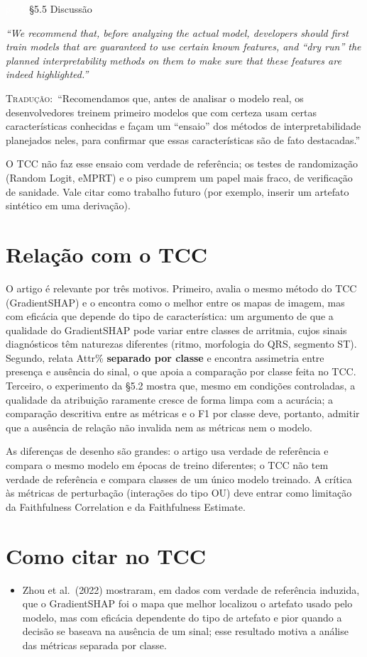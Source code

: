 \documentclass[11pt,a4paper]{article}
\newcommand{\pagechip}[1]{{\setlength{\fboxsep}{1.5pt}\colorbox{cAcc}{\textcolor{white}{\scriptsize\texttt{#1}}}}}
\newenvironment{origquote}{\par\itshape\small}{\par}
\newenvironment{tradquote}{\par\small\textsc{Tradução:}\ }{\par}
\newcommand{\explab}[1]{\par\smallskip{\small\color{cAcc}\textbf{\MakeUppercase{#1}}}\par}
\begin{document}
\begin{citacard}{\pagechip{p. 6} §5.5 Discussão}
\begin{origquote}“We recommend that, before analyzing the actual model, developers should first train models that are guaranteed to use certain known features, and “dry run” the planned interpretability methods on them to make sure that these features are indeed highlighted.”\end{origquote}
\begin{tradquote}“Recomendamos que, antes de analisar o modelo real, os desenvolvedores treinem primeiro modelos que com certeza usam certas características conhecidas e façam um “ensaio” dos métodos de interpretabilidade planejados neles, para confirmar que essas características são de fato destacadas.”\end{tradquote}
\explab{Explicação}
O TCC não faz esse ensaio com verdade de referência; os testes de randomização (Random Logit, eMPRT) e o piso cumprem um papel mais fraco, de verificação de sanidade. Vale citar como trabalho futuro (por exemplo, inserir um artefato sintético em uma derivação).
\end{citacard}

\section{Relação com o TCC}
O artigo é relevante por três motivos. Primeiro, avalia o mesmo método do TCC (GradientSHAP) e o encontra como o melhor entre os mapas de imagem, mas com eficácia que depende do tipo de característica: um argumento de que a qualidade do GradientSHAP pode variar entre classes de arritmia, cujos sinais diagnósticos têm naturezas diferentes (ritmo, morfologia do QRS, segmento ST). Segundo, relata Attr\% \textbf{separado por classe} e encontra assimetria entre presença e ausência do sinal, o que apoia a comparação por classe feita no TCC. Terceiro, o experimento da §5.2 mostra que, mesmo em condições controladas, a qualidade da atribuição raramente cresce de forma limpa com a acurácia; a comparação descritiva entre as métricas e o F1 por classe deve, portanto, admitir que a ausência de relação não invalida nem as métricas nem o modelo.

As diferenças de desenho são grandes: o artigo usa verdade de referência e compara o mesmo modelo em épocas de treino diferentes; o TCC não tem verdade de referência e compara classes de um único modelo treinado. A crítica às métricas de perturbação (interações do tipo OU) deve entrar como limitação da Faithfulness Correlation e da Faithfulness Estimate.

\section{Como citar no TCC}
\begin{itemize}
  \item Zhou et al.\ (2022) mostraram, em dados com verdade de referência induzida, que o GradientSHAP foi o mapa que melhor localizou o artefato usado pelo modelo, mas com eficácia dependente do tipo de artefato e pior quando a decisão se baseava na ausência de um sinal; esse resultado motiva a análise das métricas separada por classe.
\end{itemize}
\end{document}
